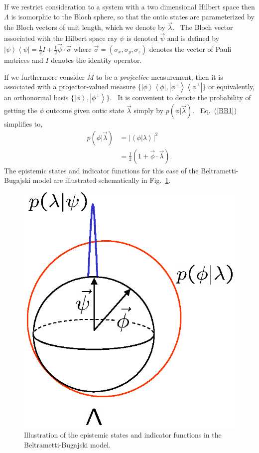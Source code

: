 \documentclass[aps,nofootinbib,12pt]{revtex4-2}
\begin{document}
If we restrict consideration to a system with a two dimensional
Hilbert space then $\Lambda$ is isomorphic to the Bloch sphere, so
that the ontic states are parameterized by the Bloch vectors of unit
length, which we denote by $\vec{\lambda}.$ \ The Bloch vector
associated with the Hilbert space ray $\psi$ is denoted $\vec{\psi}$
and is defined by $\left\vert \psi\right\rangle \left\langle
\psi\right\vert
=\frac{1}{2}I+\frac{1}{2}\vec{\psi}\cdot\vec{\sigma}$ where
$\vec{\sigma }=(\sigma_{x},\sigma_{y},\sigma_{z})$ denotes the
vector of Pauli matrices and $I$ denotes the identity operator.

If we furthermore consider $M$ to be a \textit{projective}
measurement, then it is associated with a projector-valued measure
$\{\left\vert \phi \right\rangle \left\langle \phi\right\vert
,\left\vert \phi^{\perp }\right\rangle \left\langle
\phi^{\perp}\right\vert \}$ or equivalently, an orthonormal basis
$\{\left\vert \phi\right\rangle ,\left\vert \phi^{\perp
}\right\rangle \}.$ \ It is convenient to denote the probability of
getting the $\phi$ outcome given ontic state $\vec{\lambda}$ simply
by $p(\phi |\vec{\lambda})$. \ Eq.~(\ref{BB1}) simplifies to,
\begin{align}
p(  \phi|\vec{\lambda})    & =|\left\langle \phi|\lambda
\right\rangle |^{2}\\
& =\frac{1}{2}\left(  1+\vec{\phi}\cdot\vec{\lambda}\right)
\label{BBif}.
\end{align}
The epistemic states and indicator functions for this case of the
Beltrametti-Bugajski model are illustrated schematically in
Fig.~\ref{FIG:bbmodel}.

\begin{figure}[t]
\includegraphics[scale=0.6]{bbmodel}\caption{Illustration of the epistemic
states and indicator functions in the Beltrametti-Bugajski model.}
\label{FIG:bbmodel}
\end{figure}
\end{document}
